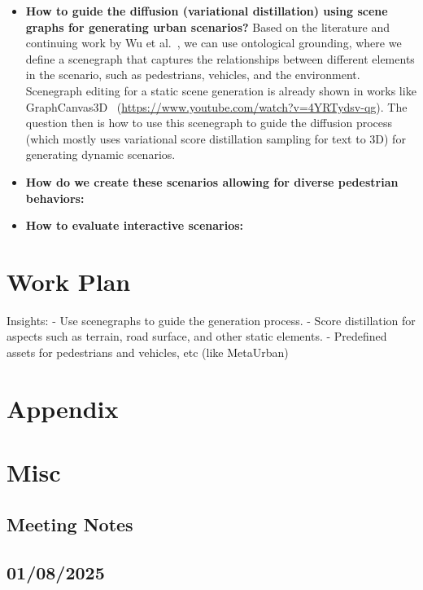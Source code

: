 \documentclass{article}
\begin{document}
\begin{itemize}
    \item \textbf{How to guide the diffusion (variational distillation) using scene graphs for generating urban scenarios?} Based on the literature and continuing work by Wu et al.~\cite{wu2022designing}, we can use ontological grounding, where we define a scenegraph that captures the relationships between different elements in the scenario, such as pedestrians, vehicles, and the environment. Scenegraph editing for a static scene generation is already shown in works like GraphCanvas3D~\cite{liu2024graph} (\url{https://www.youtube.com/watch?v=4YRTydsv-qg}). The question then is how to use this scenegraph to guide the diffusion process (which mostly uses variational score distillation sampling for text to 3D) for generating dynamic scenarios.

    \item \textbf{How do we create these scenarios allowing for diverse pedestrian behaviors:} %

    \item \textbf{How to evaluate interactive scenarios:} 
\end{itemize}

\section{Work Plan}

Insights:
- Use scenegraphs to guide the generation process.
- Score distillation for aspects such as terrain, road surface, and other static elements.
- Predefined assets for pedestrians and vehicles, etc (like MetaUrban)


\section*{Appendix}

\section{Misc}

\subsection{Meeting Notes}

\subsection{01/08/2025}    
\end{document}
